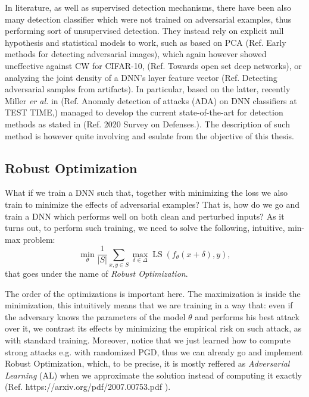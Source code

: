 \documentclass[LaM,binding=0.6cm]{./packages/sapthesis/sapthesis}
\begin{document}
            In literature, as well as supervised detection mechanisms, there have been also many 
            detection classifier which were not trained on adversarial examples, thus performing sort of unsupervised detection.
            They instead rely on explicit null hypothesis and statistical models to work, such as based on PCA (Ref. Early methods for
            detecting adversarial images), which again however showed uneffective against CW for CIFAR-10, (Ref. Towards open set
            deep networks), or analyzing the joint density of a DNN's layer feature vector (Ref. Detecting adversarial samples from artifacts).
            In particular, based on the latter, recently Miller \textit{er al.} in (Ref. Anomaly
            detection of attacks (ADA) on DNN classifiers at TEST TIME,) managed to develop the current state-of-the-art for detection
            methods as stated in (Ref. 2020 Survey on Defenses.). The description of such method is however quite involving and esulate from
            the objective of this thesis.
            
            
            \subsection{Robust Optimization}

                What if we train a DNN such that, together with minimizing the loss we also
                train to minimize the effects of adversarial examples? That is, how do we go and train
                a DNN which performs well on both clean and perturbed inputs? As it turns out, to perform
                such training, we need to solve the following, intuitive, min-max problem:
                \begin{equation}
                    \label{robopt}
                    \underset{\theta}{\operatorname{min}} \frac{1}{|S|} \sum_{x, y \in S} \max _{\delta \in \Delta} \operatorname{LS}\left(f_{\theta}(x+\delta), y\right),
                \end{equation}
                that goes under the name of \textit{Robust Optimization}.
                
                The order of the optimizations is important here. The maximization is inside the minimization, this
                intuitively means that we are training in a way that: even if the adversary knows the 
                parameters of the model $\theta$ and performs his best attack over it, we contrast
                its effects by minimizing the empirical risk on such attack, as with standard training.
                Moreover, notice that we just learned how to compute strong attacks e.g. with randomized PGD, thus we
                can already go and implement Robust Optimization, which, to be precise, it is mostly reffered as \textit{Adversarial
                Learning} (AL) when we approximate the solution instead of computing it exactly (Ref. https://arxiv.org/pdf/2007.00753.pdf ).
\end{document}
